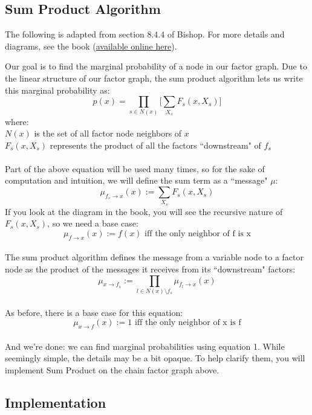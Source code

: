 \documentclass[11pt]{article}
\begin{document}
\subsection{Sum Product Algorithm} %
The following is adapted from section 8.4.4 of Bishop. For more details and diagrams, see the book (\href{http://research.microsoft.com/en-us/um/people/cmbishop/prml/Bishop-PRML-sample.pdf}{available online here}).

Our goal is to find the marginal probability of a node in our factor graph. Due to the linear structure of our factor graph, the sum product algorithm lets us write this marginal probability as:
\begin{equation}
	p(x) = \prod_{s \in N(x)} \Bigg[ \sum_{X_s} F_s(x, X_s) \Bigg]
\end{equation}
where:\\
\indent $N(x)$ is the set of all factor node neighbors of $x$\\
\indent $F_s(x, X_s)$ represents the product of all the factors ``downstream" of $f_s$\\
\\
Part of the above equation will be used many times, so for the sake of computation and intuition, we will define the sum term as a ``message" $\mu$:
\begin{equation}
	\mu_{f_s \rightarrow x}(x) := \sum_{X_s} F_s(x, X_s)
\end{equation}
If you look at the diagram in the book, you will see the recursive nature of $F_s(x, X_s)$, so we need a base case:
\[
	\mu_{f \rightarrow x}(x) := f(x) \text{ iff the only neighbor of f is x}
\]
\\
The sum product algorithm defines the message from a variable node to a factor node as the product of the messages it receives from its ``downstream" factors:
\begin{equation}
	\mu_{x \rightarrow f_s} := \prod_{l \in N(x) \setminus f_s} \mu_{f_l \rightarrow x}(x)
\end{equation}
\\
As before, there is a base case for this equation:
\[
	\mu_{x \rightarrow f}(x) := 1 \text{ iff the only neighbor of x is f}
\]
\\
And we're done: we can find marginal probabilities using equation 1. While seemingly simple, the details may be a bit opaque. To help clarify them, you will implement Sum Product on the chain factor graph above.


\subsection{Implementation} %
\end{document}
